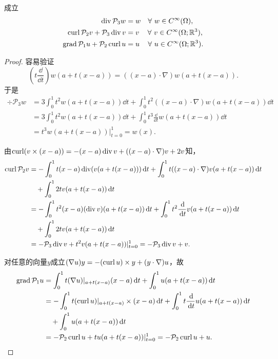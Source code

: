 \begin{lemma}
成立
\begin{align}
\label{eq:poincareidentity3}
\operatorname{div}\mathcal{P}_3w&=w \quad\forall~w\in C^{\infty}(\Omega), \\
\label{eq:poincareidentity2}
\operatorname{curl}\mathcal{P}_2v+\mathcal{P}_3\operatorname{div} v&=v \quad\,\forall~v\in C^{\infty}(\Omega;\mathbb R^3), \\
\label{eq:poincareidentity1}
\operatorname{grad}\mathcal{P}_1u+\mathcal{P}_2\operatorname{curl} u&=u \quad\,\forall~u\in C^{\infty}(\Omega;\mathbb R^3).
\end{align}
\end{lemma}
\begin{proof}
容易验证
$$
(t\frac{\dd}{\dd t})w(a+t(x-a))=((x-a)\cdot\nabla)w(a+t(x-a)).
$$
于是
\begin{align*}    
\div\mathcal{P}_3w&=3\int_0^1t^2w(a+t(x-a))\dd t + \int_0^1t^2((x-a)\cdot\nabla)w(a+t(x-a))\dd t \\
&=3\int_0^1t^2w(a+t(x-a))\dd t + \int_0^1t^3\frac{\dd}{\dd t}w(a+t(x-a))\dd t \\
&=t^3w(a+t(x-a))|_{t=0}^1=w(x).
\end{align*}

由$\operatorname{curl}(v\times(x-a))=-(x-a)\operatorname{div} v+((x-a)\cdot\nabla) v+2v$知，
\begin{align*}
\operatorname{curl}\mathcal{P}_2v&=-\int_0^1t(x-a)\operatorname{div}(v(a+t(x-a)))\,{\rm d} t + \int_0^1 t((x-a)\cdot\nabla) v(a+t(x-a))\,{\rm d} t \\
& \quad + \int_0^12tv(a+t(x-a))\,{\rm d} t \\
&=-\int_0^1t^2(x-a)(\operatorname{div} v)(a+t(x-a))\,{\rm d} t + \int_0^1 t^2\frac{\,{\rm d}}{\,{\rm d} t} v(a+t(x-a))\,{\rm d} t \\
& \quad + \int_0^12tv(a+t(x-a))\,{\rm d} t \\
&=-\mathcal{P}_3\operatorname{div} v + t^2v(a+t(x-a))|_{t=0}^1=-\mathcal{P}_3\operatorname{div} v+v.
\end{align*}

对任意的向量$y$成立$(\nabla u)y=-(\operatorname{curl} u)\times y + (y\cdot\nabla)u$，故
\begin{align*}
\operatorname{grad}\mathcal{P}_1u&=\int_0^1t(\nabla u)|_{a+t(x-a)}(x-a)\,{\rm d} t + \int_0^1 u(a+t(x-a))\,{\rm d} t \\
&=-\int_0^1t(\operatorname{curl} u)|_{a+t(x-a)}\times(x-a)\,{\rm d} t + \int_0^1 t\frac{\,{\rm d}}{\,{\rm d} t}u(a+t(x-a))\,{\rm d} t \\
& \quad + \int_0^1 u(a+t(x-a))\,{\rm d} t \\
&=-\mathcal{P}_2\operatorname{curl} u + tu(a+t(x-a))|_{t=0}^1=-\mathcal{P}_2\operatorname{curl} u+u.
\end{align*}
\end{proof}

